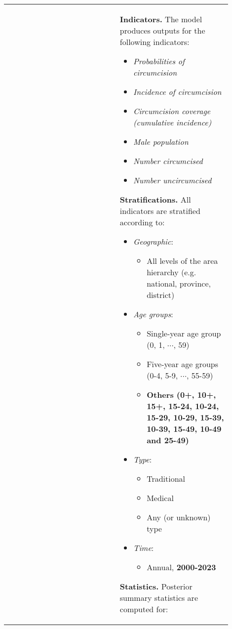 \documentclass{article}
\begin{document}
\begin{appendix}
{\begin{table}[H]
\begin{tabular}{| p{0.45\linewidth} | p{0.45\linewidth} |}
		& 
			{\bf Indicators.}  The model produces outputs for the following indicators:
			\begin{itemize}
				\item {\it Probabilities of circumcision}
                \item {\it Incidence of circumcision}
				\item {\it Circumcision coverage (cumulative incidence)}
				\item {\it Male population}
				\item {\it Number circumcised}
				\item {\it Number uncircumcised}
			\end{itemize}
			\vspace{5pt}
			{\bf Stratifications.} All indicators are stratified according to: 
			\begin{itemize}
				\item {\it Geographic}: 
				\begin{itemize}
					\item All levels of the area hierarchy (e.g. national, province, district)
				\end{itemize}
				\item {\it Age groups}: 
				\begin{itemize}
					\item Single-year age group (0, 1, $\cdots$, 59)
					\item Five-year age groups (0-4, 5-9, $\cdots$, 55-59)
					\item {\color{red}\bf Others (0+, 10+, 15+, 15-24, 10-24, 15-29, 10-29, 15-39, 10-39, 15-49, 10-49 and 25-49)}
				\end{itemize}
				\item {\it Type}: 
				\begin{itemize}
					\item Traditional
					\item Medical 
					\item Any (or unknown) type 
				\end{itemize}
				\item {\it Time}: 
				\begin{itemize}
					\item Annual, {\color{red}\bf 2000-2023}
				\end{itemize}
			\end{itemize}
			\vspace{5pt}
			{\bf Statistics.} Posterior summary statistics are computed for:
			\begin{itemize}

\end{itemize}
\end{tabular}
\end{table}}
\end{appendix}
\end{document}
